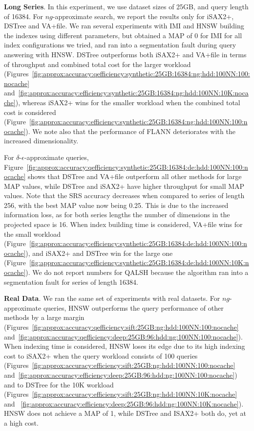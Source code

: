 {{%
\noindent\textbf{Long Series}. 
In this experiment, we use dataset sizes of 25GB, and query length of 16384.
For $ng$-approximate search, we report the results only for iSAX2+, DSTree and VA+file. We ran several experiments with IMI and HNSW building the indexes using different parameters, but obtained a MAP of 0 for IMI for all index configurations we tried, and ran into a segmentation fault during query answering with HNSW. 
DSTree outperforms both iSAX2+ and VA+file in terms of throughput and combined total cost for the larger workload (Figures~\ref{fig:approx:accuracy:qefficiency:synthetic:25GB:16384:ng:hdd:100NN:100:nocache} and~\ref{fig:approx:accuracy:efficiency:synthetic:25GB:16384:ng:hdd:100NN:10K:nocache}), whereas iSAX2+ wins for the smaller workload when the combined total cost is considered (Figure~\ref{fig:approx:accuracy:efficiency:synthetic:25GB:16384:ng:hdd:100NN:100:nocache}). {\color{black}We note also that the performance of FLANN deteriorates with the increased dimensionality.}

For $\delta$-$\epsilon$-approximate queries, Figure~\ref{fig:approx:accuracy:qefficiency:synthetic:25GB:16384:de:hdd:100NN:100:nocache} shows that DSTree and VA+file outperform all other methods for large MAP values, while DSTree and iSAX2+ have higher throughput for small MAP values. 
Note that the SRS accuracy decreases when compared to series of length 256, with the best MAP value now being 0.25. 
This is due to the increased information loss, as for both series lengths the number of dimensions in the projected space is 16. 
When index building time is considered, VA+file wins for the small workload (Figure~\ref{fig:approx:accuracy:efficiency:synthetic:25GB:16384:de:hdd:100NN:100:nocache}), and iSAX2+ and DSTree win for the large one (Figure~\ref{fig:approx:accuracy:efficiency:synthetic:25GB:16384:de:hdd:100NN:10K:nocache}). {\color{black}We do not report numbers for QALSH because the algorithm ran into a segmentation fault for series of length 16384.}

\noindent\textbf{Real Data}. 
We ran the same set of experiments with real datasets. 
For $ng$-approximate queries, HNSW outperforms the query performance of other methods by a large margin (Figures~\ref{fig:approx:accuracy:qefficiency:sift:25GB:ng:hdd:100NN:100:nocache} and~\ref{fig:approx:accuracy:qefficiency:deep:25GB:96:hdd:ng:100NN:100:nocache}). When indexing time is considered, HNSW loses its edge due to its high indexing cost to iSAX2+ when the query workload consists of 100 queries (Figures~\ref{fig:approx:accuracy:efficiency:sift:25GB:ng:hdd:100NN:100:nocache} and~\ref{fig:approx:accuracy:efficiency:deep:25GB:96:hdd:ng:100NN:100:nocache}) and to DSTree for the 10K workload (Figures~\ref{fig:approx:accuracy:efficiency:sift:25GB:ng:hdd:100NN:10K:nocache} and ~\ref{fig:approx:accuracy:efficiency:deep:25GB:96:hdd:ng:100NN:10K:nocache}). 
HNSW does not achieve a MAP of 1, while DSTree and ISAX2+ both do,  yet at a high cost. 

}}
